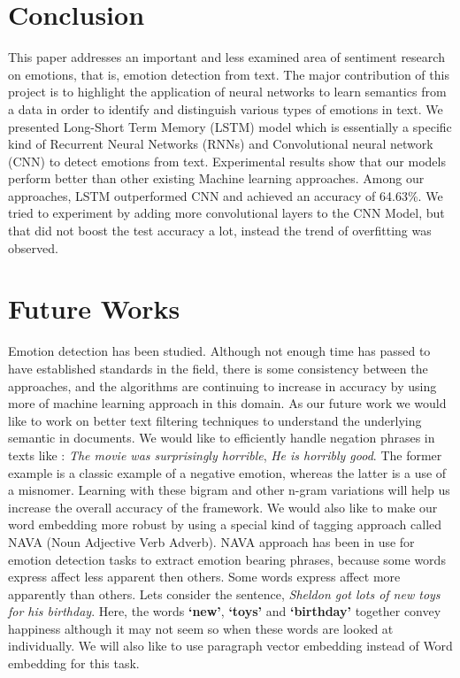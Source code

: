 \documentclass[conference]{IEEEtran}
\numberwithin{equation}{section}
\numberwithin{figure}{section}
\numberwithin{table}{section}
\begin{document}
\section{Conclusion}
This paper addresses an important and less examined area of sentiment research on emotions, that is, emotion detection from text. The major contribution of this project is to highlight the application of neural networks to learn semantics from a data in order to identify and distinguish various types of emotions in text. We presented Long-Short Term Memory (LSTM) model which is essentially a specific kind of Recurrent Neural Networks (RNNs) and Convolutional neural network (CNN) to detect emotions from text. Experimental results show that our models perform better than other existing Machine learning approaches. Among our approaches, LSTM outperformed CNN and achieved an accuracy of 64.63\%. We tried to experiment by adding more convolutional layers to the CNN Model, but that did not boost the test accuracy a lot, instead the trend of overfitting was observed.

\section{Future Works}
Emotion detection has been studied. Although not enough time has passed to have established standards in the field, there is some consistency between the approaches, and the algorithms are continuing to increase in accuracy by using more of machine learning approach in this domain. As our future work we would like to work on better text filtering techniques to understand the underlying semantic in documents. We would like to efficiently handle negation phrases in texts like : \textit{The movie was surprisingly horrible}, \textit{He is horribly good}. The former example is a classic example of a negative emotion, whereas the latter is a use of a misnomer. Learning with these bigram and other n-gram variations will help us increase the overall accuracy of the framework. We would also like to make our word embedding more robust by using a special kind of tagging approach called NAVA (Noun Adjective Verb Adverb). NAVA approach has been in use for emotion detection tasks to extract emotion bearing phrases, because some words express affect less apparent then others. Some words express affect more apparently than others. Lets consider the sentence, \textit{Sheldon got lots of new toys for his birthday}. Here, the words \textbf{‘new’}, \textbf{‘toys’} and \textbf{‘birthday’} together convey happiness although it may not seem so when these words are looked at individually. We will also like to use paragraph vector embedding instead of Word embedding for this task. 
\end{document}
